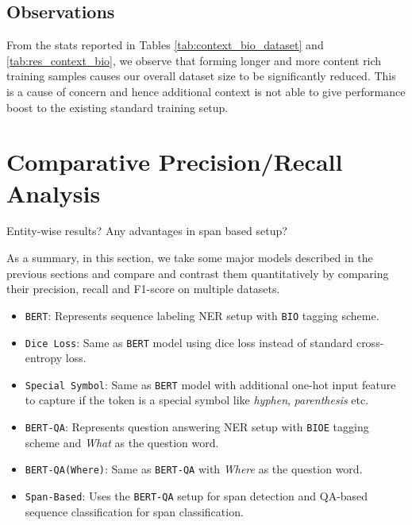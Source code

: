 \subsection{Observations}
From the stats reported in Tables \ref{tab:context_bio_dataset} and \ref{tab:res_context_bio}, we observe that forming longer and more content rich training samples causes our overall dataset size to be significantly reduced. This is a cause of concern and hence additional context is not able to give performance boost to the existing standard training setup.

\section{Comparative Precision/Recall Analysis}
\label{sec:precision_recall_analysis}

Entity-wise results? Any advantages in span based setup?

As a summary, in this section, we take some major models described in the previous sections and compare and contrast them quantitatively by comparing their precision, recall and F1-score on multiple datasets.

\begin{itemize}
    \item \texttt{BERT}: Represents sequence labeling NER setup with \texttt{BIO} tagging scheme.
    
    \item \texttt{Dice Loss}: Same as \texttt{BERT} model using dice loss instead of standard cross-entropy loss.
    
    \item \texttt{Special Symbol}: Same as \texttt{BERT} model with additional one-hot input feature to capture if the token is a special symbol like \textit{hyphen}, \textit{parenthesis} etc.
    
    \item \texttt{BERT-QA}: Represents question answering NER setup with \texttt{BIOE} tagging scheme and \textit{What} as the question word.
    
    \item \texttt{BERT-QA(Where)}: Same as \texttt{BERT-QA} with \textit{Where} as the question word.
    
    \item \texttt{Span-Based}: Uses the \texttt{BERT-QA} setup for span detection and QA-based sequence classification for span classification.
\end{itemize}

